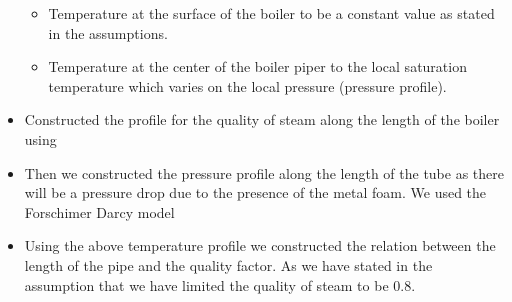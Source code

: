 \documentclass[compileTAMUreport.tex]{subfiles}
\begin{document}
\begin{itemize}
\begin{itemize}
\item Temperature at the surface of the boiler to be a constant value as stated in the assumptions.
\item Temperature at the center of the boiler piper to the local saturation temperature which varies on the local pressure (pressure profile).
\end{itemize}
\item	Constructed the profile for the quality of steam along the length of the boiler using 
\item	Then we constructed the pressure profile along the length of the tube as there will be a pressure drop due to the presence of the metal foam.  We used the Forschimer Darcy model 

\item Using the above temperature profile we constructed the relation between the length of the pipe and the quality factor. As we have stated in the assumption that we have limited the quality of steam to be 0.8.
\end{itemize}
\end{document}
